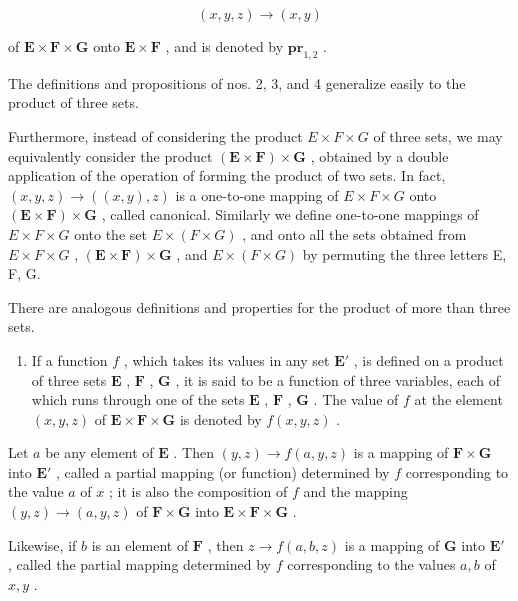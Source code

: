\[
(x, y, z) \rightarrow (x, y)
\]

of \(\mathbf{E} \times \mathbf{F} \times \mathbf{G}\) onto \(\mathbf{E} \times \mathbf{F}\) , and is denoted by \(\mathbf{pr}_{1,2}\) .

The definitions and propositions of nos. 2, 3, and 4 generalize easily to the product of three sets.

Furthermore, instead of considering the product \(E \times F \times G\) of three sets, we may equivalently consider the product \((\mathbf{E} \times \mathbf{F}) \times \mathbf{G}\) , obtained by a double application of the operation of forming the product of two sets. In fact, \((x, y, z) \to ((x, y), z)\) is a one-to-one mapping of \(E \times F \times G\) onto \((\mathbf{E} \times \mathbf{F}) \times \mathbf{G}\) , called canonical. Similarly we define one-to-one mappings of \(E \times F \times G\) onto the set \(E \times (F \times G)\) , and onto all the sets obtained from \(E \times F \times G\) , \((\mathbf{E} \times \mathbf{F}) \times \mathbf{G}\) , and \(E \times (F \times G)\) by permuting the three letters E, F, G.

There are analogous definitions and properties for the product of more than three sets.

\begin{enumerate}
\def\labelenumi{\arabic{enumi}.}
\setcounter{enumi}{12}
\tightlist
\item
  If a function \(f\) , which takes its values in any set \(\mathbf{E}'\) , is defined on a product of three sets \(\mathbf{E}\) , \(\mathbf{F}\) , \(\mathbf{G}\) , it is said to be a function of three variables, each of which runs through one of the sets \(\mathbf{E}\) , \(\mathbf{F}\) , \(\mathbf{G}\) . The value of \(f\) at the element \((x, y, z)\) of \(\mathbf{E} \times \mathbf{F} \times \mathbf{G}\) is denoted by \(f(x, y, z)\) .
\end{enumerate}

Let \(a\) be any element of \(\mathbf{E}\) . Then \((y, z) \to f(a, y, z)\) is a mapping of \(\mathbf{F} \times \mathbf{G}\) into \(\mathbf{E}'\) , called a partial mapping (or function) determined by \(f\) corresponding to the value \(a\) of \(x\) ; it is also the composition of \(f\) and the mapping \((y, z) \to (a, y, z)\) of \(\mathbf{F} \times \mathbf{G}\) into \(\mathbf{E} \times \mathbf{F} \times \mathbf{G}\) .

Likewise, if \(b\) is an element of \(\mathbf{F}\) , then \(z \to f(a, b, z)\) is a mapping of \(\mathbf{G}\) into \(\mathbf{E}'\) , called the partial mapping determined by \(f\) corresponding to the values \(a, b\) of \(x, y\) .

